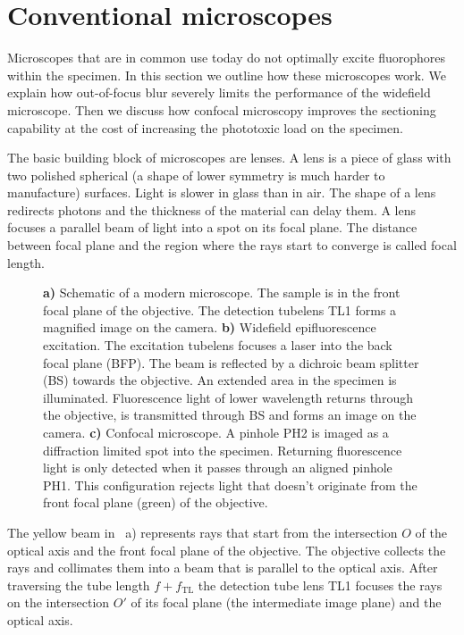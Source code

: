 \section{Conventional microscopes}
\begin{summary}
  Microscopes that are in common use today do not optimally excite
  fluorophores within the specimen. In this section we outline how
  these microscopes work. We explain how out-of-focus blur severely
  limits the performance of the widefield microscope. Then we discuss
  how confocal microscopy improves the sectioning capability at the
  cost of increasing the phototoxic load on the specimen.
\end{summary}
The basic building block of microscopes are lenses. A lens is a piece
of glass with two polished spherical (a shape of lower symmetry is
much harder to manufacture) surfaces. Light is slower in glass than in
air. The shape of a lens redirects photons and the thickness of the
material can delay them. A lens focuses a parallel beam of light into
a spot on its focal plane. The distance between focal plane and the
region where the rays start to converge is called focal length.
\begin{figure}[!hbt]
  \centering
  
  \caption{{\bf a)} Schematic of a modern microscope. The sample is in
    the front focal plane of the objective. The detection tubelens TL1
    forms a magnified image on the camera. {\bf b)} Widefield
    epifluorescence excitation. The excitation tubelens focuses a
    laser into the back focal plane (BFP). The beam is reflected by a
    dichroic beam splitter (BS) towards the objective. An extended
    area in the specimen is illuminated. Fluorescence light of lower
    wavelength returns through the objective, is transmitted through
    BS and forms an image on the camera. {\bf c)} Confocal
    microscope. A pinhole PH2 is imaged as a diffraction limited spot
    into the specimen. Returning fluorescence light is only detected
    when it passes through an aligned pinhole PH1. This configuration
    rejects light that doesn't originate from the front focal plane
    (green) of the objective.}
  \label{fig:widefield-microscope}
\end{figure}

The yellow beam in ~a) represents
rays that start from the intersection $O$ of the optical axis and the
front focal plane of the objective. The objective collects the rays
and collimates them into a beam that is parallel to the optical
axis. After traversing the tube length $f+f_\textrm{TL}$ the detection
tube lens TL1 focuses the rays on the intersection $O'$ of its focal
plane (the intermediate image plane) and the optical axis.

